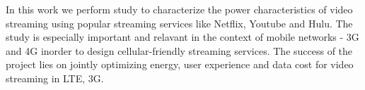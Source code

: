 In this work we perform study to characterize the power characteristics of video streaming using popular streaming services like Netflix, Youtube and Hulu. The study is especially important and relavant in the context of mobile networks - 3G and 4G inorder to design cellular-friendly streaming services. The success of the project lies on jointly optimizing energy, user experience and data cost for video streaming in LTE, 3G.      
